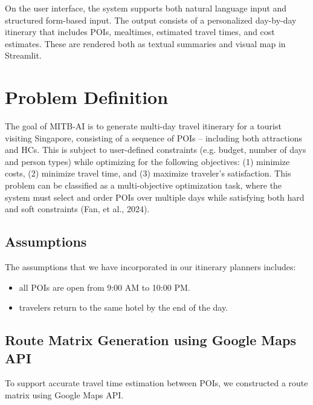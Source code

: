 \documentclass{ecai}
\begin{document}
On the user interface, the system supports both natural language input and structured form-based input. The output consists of a personalized day-by-day itinerary that includes POIs, mealtimes, estimated travel times, and cost estimates. These are rendered both as textual summaries and visual map in Streamlit.

\section{Problem Definition}
The goal of MITB-AI is to generate multi-day travel itinerary for a tourist visiting Singapore, consisting of a sequence of POIs – including both attractions and HCs. This is subject to user-defined constraints (e.g. budget, number of days and person types) while optimizing for the following objectives: (1) minimize costs, (2) minimize travel time, and (3) maximize traveler’s satisfaction. This problem can be classified as a multi-objective optimization task, where the system must select and order POIs over multiple days while satisfying both hard and soft constraints (Fan, et al., 2024).

\subsection{Assumptions}
The assumptions that we have incorporated in our itinerary planners includes: 
\begin{itemize}
    \item all POIs are open from 9:00 AM to 10:00 PM.
    \item travelers return to the same hotel by the end of the day.
\end{itemize}
\vspace{-0.1cm}

\subsection{Route Matrix Generation using Google Maps API}
To support accurate travel time estimation between POIs, we constructed a route matrix using Google Maps API.
\end{document}
